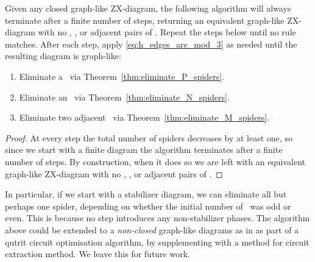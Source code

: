 \begin{theorem}\label{thm:simplification_algorithm_works}
	Given any closed graph-like ZX-diagram, the following algorithm will always terminate after a finite number of steps, returning an equivalent graph-like ZX-diagram with no \Nspiders, \Pspiders, or adjacent pairs of \Mspiders. Repeat the steps below until no rule matches. After each step, apply \eqref{eq:h_edges_are_mod_3} as needed until the resulting diagram is graph-like:
	\begin{enumerate}
		\item Eliminate a \Pspider\ via Theorem~\ref{thm:eliminate_P_spiders}.
		\item Eliminate an \Nspider\ via Theorem~\ref{thm:eliminate_N_spiders}.
		\item Eliminate two adjacent \Mspiders\ via Theorem~\ref{thm:eliminate_M_spiders}.
	\end{enumerate}
	\begin{proof}
		At every step the total number of spiders decreases by at least one, so since we start with a finite diagram the algorithm terminates after a finite number of steps. By construction, when it does so we are left with an equivalent graph-like ZX-diagram with no \Nspiders, \Pspiders, or adjacent pairs of \Mspiders.
	\end{proof}
\end{theorem}
In particular, if we start with a stabilizer diagram, we can eliminate all but perhaps one spider, depending on whether the initial number of \Mspiders\ was odd or even. This is because no step introduces any non-stabilizer phases. The algorithm above could be extended to a \emph{non-closed} graph-like diagrams as in \cite[Theorem 5.4]{graph_theoretic_simplification} as part of a qutrit circuit optimisation algorithm, by supplementing with a method for circuit extraction method. We leave this for future work.
